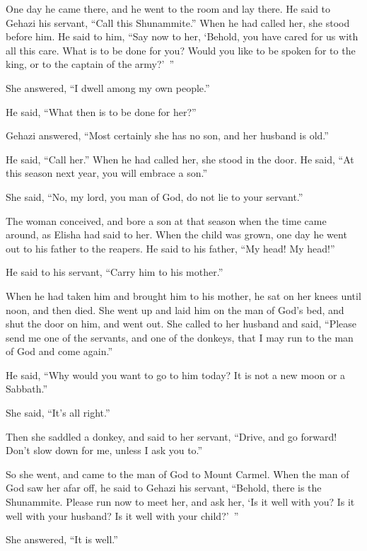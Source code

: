 \myverse{}One day he came there, and he went to the room and lay there.
\myverse{}He said to Gehazi his servant, “Call this Shunammite.” When he had called
her, she stood before him.
\myverse{}He said to him, “Say now to her, ‘Behold, you have cared for us with all this
care. What is to be done for you? Would you like to be spoken for to the king, or to the captain of the
army?’ ”

She answered, “I dwell among my own people.”

\myverse{}He said, “What then is to be done for her?”

Gehazi answered, “Most certainly she has no son, and her husband is old.”

\myverse{}He said, “Call her.” When he had called her, she stood in the
door.
\myverse{}He said, “At this season next year, you will embrace a son.”

She said, “No, my lord, you man of God, do not lie to your servant.”

\myverse{}The woman conceived, and bore a son at that season when the time
came around, as Elisha had said to her.
\myverse{}When the child was grown, one day he went out to his father to the reapers.
\myverse{}He said to his father, “My head! My head!”

He said to his servant, “Carry him to his mother.”

\myverse{}When he had taken him and brought him to his mother, he sat on
her knees until noon, and then died.
\myverse{}She went up and laid him on the man of God’s bed, and shut the door on him,
and went out.
\myverse{}She called to her husband and said, “Please send me one of the servants, and
one of the donkeys, that I may run to the man of God and come again.”

\myverse{}He said, “Why would you want to go to him today? It is not a
new moon or a Sabbath.”

She said, “It’s all right.”

\myverse{}Then she saddled a donkey, and said to her servant, “Drive, and
go forward! Don’t slow down for me, unless I ask you to.”

\myverse{}So she went, and came to the man of God to Mount Carmel. When
the man of God saw her afar off, he said to Gehazi his servant, “Behold, there is the Shunammite.
\myverse{}Please run now to meet her, and ask her, ‘Is it well with you? Is it well
with your husband? Is it well with your child?’ ”

She answered, “It is well.”

